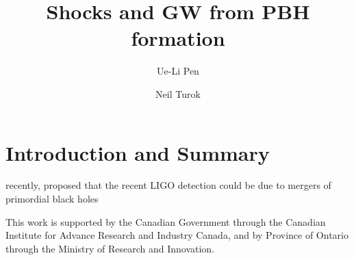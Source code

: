 \documentclass[aps,showpacs,twocolumn,floats,prd,superscriptaddress,nofootinbib]{revtex4}
\begin{document}
\title{Shocks and GW from PBH formation}


\author{Ue-Li Pen}

\author{Neil Turok}

\begin{abstract}

\end{abstract}

\maketitle

\section{Introduction and Summary}

recently, \citet{2016arXiv160300464B} proposed that the recent LIGO detection\cite{2016PhRvL.116f1102A}
could be due to mergers of primordial black holes

\acknowledgments


This work is supported by the Canadian Government through the Canadian
Institute for Advance Research and Industry Canada, and by Province of
Ontario through the Ministry of Research and Innovation.

\appendix

%

\end{document}
